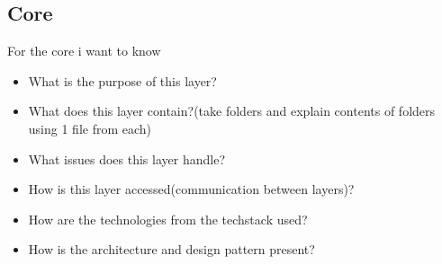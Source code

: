 \subsection{Core}
For the core i want to know
\begin{itemize}
    \item What is the purpose of this layer?
    \item What does this layer contain?(take folders and explain contents of folders using 1 file from each)
    \item What issues does this layer handle?
    \item How is this layer accessed(communication between layers)?
    \item How are the technologies from the techstack used?
    \item How is the architecture and design pattern present?
\end{itemize}
